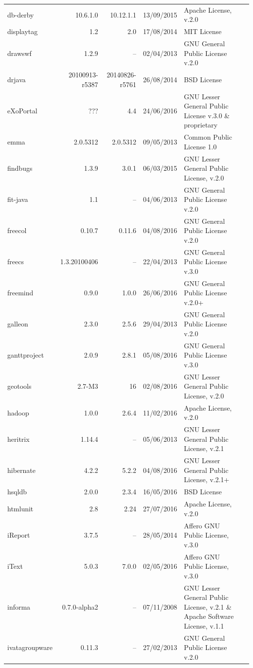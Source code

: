 \documentclass{IEEEtran}
\begin{document}
\begin{table}[h]
\begin{tabular}{l|r|r|c|p{5cm}|p{3cm}}
	db-derby & 10.6.1.0 & 10.12.1.1 & 13/09/2015 & Apache License, v.2.0 \\
	displaytag & 1.2 & 2.0 & 17/08/2014 & MIT License \\
	drawswf & 1.2.9 & -- & 02/04/2013 & GNU General Public License v.2.0 \\
	drjava & 20100913-r5387 & 20140826-r5761 & 26/08/2014 & BSD License \\
	eXoPortal & ??? & 4.4 & 24/06/2016 & GNU Lesser General Public License v.3.0 \& proprietary \\
	emma & 2.0.5312 & 2.0.5312 & 09/05/2013  & Common Public License 1.0 \\
	findbugs & 1.3.9 & 3.0.1 & 06/03/2015 & GNU Lesser General Public License, v.2.0 \\
	fit-java & 1.1 & -- & 04/06/2013 & GNU General Public License v.2.0 \\
	freecol & 0.10.7 & 0.11.6 & 04/08/2016 & GNU General Public License v.2.0 &  \\
	freecs & 1.3.20100406 & -- & 22/04/2013 & GNU General Public License v.3.0 &   \\
	freemind & 0.9.0 & 1.0.0 & 26/06/2016 & GNU General Public License v.2.0+ &  \\
	galleon & 2.3.0 & 2.5.6 & 29/04/2013 & GNU General Public License v.2.0 \\
	ganttproject & 2.0.9 & 2.8.1 & 05/08/2016 & GNU General Public License v.3.0 &  \\
	geotools & 2.7-M3 & 16 & 02/08/2016 & GNU Lesser General Public License, v.2.0 \\
	hadoop & 1.0.0 & 2.6.4 & 11/02/2016 & Apache License, v.2.0 \\
	heritrix & 1.14.4 & -- & 05/06/2013 & GNU Lesser General Public License, v.2.1 \\
	hibernate & 4.2.2 & 5.2.2 & 04/08/2016 & GNU Lesser General Public License, v.2.1+ \\
	hsqldb & 2.0.0 & 2.3.4 & 16/05/2016 & BSD License \\
	htmlunit & 2.8 & 2.24 & 27/07/2016 & Apache License, v.2.0 \\
	iReport & 3.7.5 & -- & 28/05/2014 & Affero GNU Public License, v.3.0 \\
	iText & 5.0.3 & 7.0.0 & 02/05/2016 & Affero GNU Public License, v.3.0 \\
	informa & 0.7.0-alpha2 & -- & 07/11/2008 & GNU Lesser General Public License, v.2.1 \& Apache Software License, v.1.1 \\
	ivatagroupware & 0.11.3 & -- & 27/02/2013  & GNU General Public License v.2.0 \\

\end{tabular}
\end{table}
\end{document}
